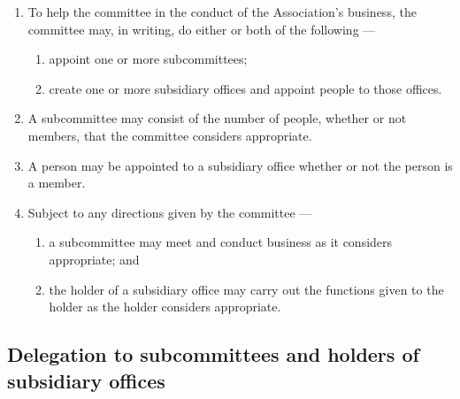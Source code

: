 \documentclass[../constitution.tex]{subfiles}
\begin{document}
\begin{enumerate}

\item To help the committee in the conduct of the Association's business, the committee may, in writing, do either or both of the following ---

  \begin{enumerate}
  
  \item appoint one or more subcommittees;
  \item create one or more subsidiary offices and appoint people to those offices.
  \end{enumerate}
\item A subcommittee may consist of the number of people, whether or not members, that the committee considers appropriate.
\item A person may be appointed to a subsidiary office whether or not the person is a member.
\item Subject to any directions given by the committee ---

  \begin{enumerate}
  
  \item a subcommittee may meet and conduct business as it considers appropriate; and
  \item the holder of a subsidiary office may carry out the functions given to the holder as the holder considers appropriate.
  \end{enumerate}
\end{enumerate}

\hypertarget{delegation-to-subcommittees-and-holders-of-subsidiary-offices}{%
\subsection{Delegation to subcommittees and holders of subsidiary offices}\label{delegation-to-subcommittees-and-holders-of-subsidiary-offices}}
\end{document}
